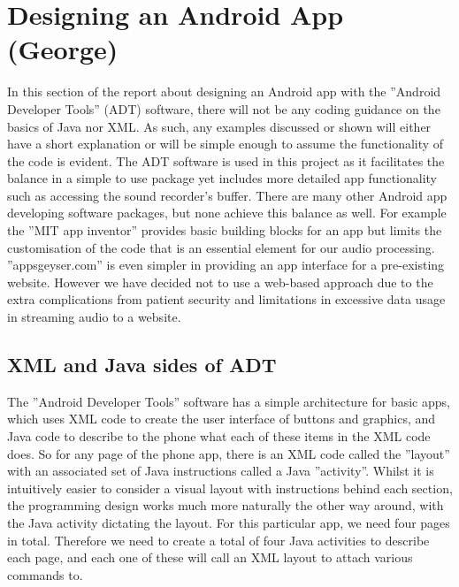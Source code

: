 \section{Designing an Android App (George)}
\label{sec:android-george}
In this section of the report about designing an Android app with the ''Android Developer Tools'' (ADT) software, there will not be any coding guidance on the basics of Java nor XML. As such, any examples discussed or shown will either have a short explanation or will be simple enough to assume the functionality of the code is evident. The ADT software is used in this project as it facilitates the balance in a simple to use package yet includes more detailed app functionality such as accessing the sound recorder’s buffer. There are many other Android app developing software packages, but none achieve this balance as well. For example the ''MIT app inventor'' provides basic building blocks for an app but limits the customisation of the code that is an essential element for our audio processing. ''appsgeyser.com'' is even simpler in providing an app interface for a pre-existing website. However we have decided not to use a web-based approach due to the extra complications from patient security and limitations in excessive data usage in streaming audio to a website.
\subsection{XML and Java sides of ADT}
The ''Android Developer Tools'' software has a simple architecture for basic apps, which uses XML code to create the user interface of buttons and graphics, and Java code to describe to the phone what each of these items in the XML code does. So for any page of the phone app, there is an XML code called the ''layout'' with an associated set of Java instructions called a Java ''activity''. Whilst it is intuitively easier to consider a visual layout with instructions behind each section, the programming design works much more naturally the other way around, with the Java activity dictating the layout. For this particular app, we need four pages in total. Therefore we need to create a total of four Java activities to describe each page, and each one of these will call an XML layout to attach various commands to.
